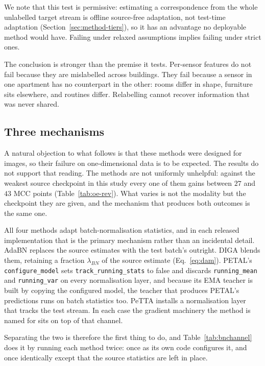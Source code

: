 \documentclass[a4paper,fleqn]{cas-dc}
\begin{document}
We note that this test is permissive: estimating a correspondence from the whole
unlabelled target stream is offline source-free adaptation, not test-time adaptation
(Section~\ref{sec:method-tiers}), so it has an advantage no deployable method would have.
Failing under relaxed assumptions implies failing under strict ones.

The conclusion is stronger than the premise it tests. Per-sensor features do not fail
because they are mislabelled across buildings. They fail because a sensor in one
apartment has no counterpart in the other: rooms differ in shape, furniture sits
elsewhere, and routines differ. Relabelling cannot recover information that was never
shared.

\subsection{Three mechanisms}
\label{sec:res-mech-intro}

A natural objection to what follows is that these methods were designed for images, so
their failure on one-dimensional data is to be expected. The results do not support that
reading. The methods are not uniformly unhelpful: against the weakest source checkpoint in
this study every one of them gains between $27$ and $43$ MCC points
(Table~\ref{tab:oe-rev}). What varies is not the modality but the checkpoint they are
given, and the mechanism that produces both outcomes is the same one.

All four methods adapt batch-normalisation statistics, and in each released implementation
that is the primary mechanism rather than an incidental detail. AdaBN replaces the source
estimates with the test batch's outright. DIGA blends them, retaining a fraction
$\lambda_{BN}$ of the source estimate (Eq.~\ref{eq:dam}). PETAL's \texttt{configure\_model}
sets \texttt{track\_running\_stats} to false and discards \texttt{running\_mean} and
\texttt{running\_var} on every normalisation layer, and because its EMA teacher is built by
copying the configured model, the teacher that produces PETAL's predictions runs on batch
statistics too. PeTTA installs a normalisation layer that tracks the test stream. In each
case the gradient machinery the method is named for sits on top of that channel.

Separating the two is therefore the first thing to do, and Table~\ref{tab:bnchannel} does
it by running each method twice: once as its own code configures it, and once identically
except that the source statistics are left in place.
\end{document}
